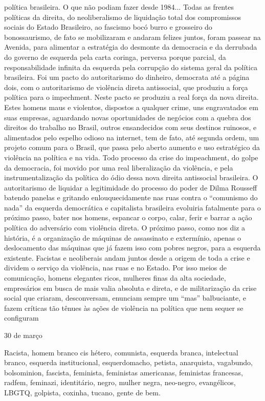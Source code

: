 política brasileira. O que não podiam fazer desde 1984... Todas as
frentes políticas da direita, do neoliberalismo de liquidação total dos
compromissos sociais do Estado Brasileiro, ao fascismo bocó burro e
grosseiro do bonossaurismo, de fato se mobilizaram e andaram felizes
juntos, foram passear na Avenida, para alimentar a estratégia do
desmonte da democracia e da derrubada do governo de esquerda pela carta
coringa, perversa porque parcial, da responsabilidade infinita da
esquerda pela corrupção do sistema geral da política brasileira. Foi um
pacto do autoritarismo do dinheiro, democrata até a página dois, com o
autoritarismo de violência direta antissocial, que produziu a força
política para o impechment. Neste pacto se produziu a real força da nova
direita. Estes homens maus e violentos, dispostos a qualquer crime, uns
engravatados em suas empresas, aguardando novas oportunidades de
negócios com a quebra dos direitos do trabalho no Brasil, outros
ensandecidos com seus destinos ruinosos, e alimentados pelo espelho
odioso na internet, tem de fato, até segunda ordem, um projeto comum
para o Brasil, que passa pelo aberto aumento e uso estratégico da
violência na política e na vida. Todo processo da crise do impeachment,
do golpe da democracia, foi movido por uma real liberalização da
violência, e pela instrumentalização da política do ódio dessa nova
direita antissocial brasileira. O autoritarismo de liquidar a
legitimidade do processo do poder de Dilma Rousseff batendo panelas e
gritando enlouquecidamente nas ruas contra o ``comunismo do nada'' da
esquerda democrática e capitalista brasileira evoluiria fatalmente para
o próximo passo, bater nos homens, espancar o corpo, calar, ferir e
barrar a ação política do adversário com violência direta. O próximo
passo, como nos diz a história, é a organização de máquinas de
assassinato e extermínio, apenas o deslocamento das máquinas que já
fazem isso com pobres negros, para a esquerda existente. Facistas e
neoliberais andam juntos desde a origem de toda a crise e dividem o
serviço da violência, nas ruas e no Estado. Por isso meios de
comunicação, homens elegantes ricos, mulheres finas da alta sociedade,
empresários em busca de mais valia absoluta e direta, e de militarização
da crise social que criaram, desconversam, enunciam sempre um ``mas''
balbuciante, e fazem críticas tão tênues às ações de violência na
política que nem sequer se configuram

30 de março

Racista, homem branco cis hétero, comunista, esquerda branca,
intelectual branco, esquerda institucional, esquerdomacho, petista,
anarquista, vagabundo, bolsominion, fascista, feminista, feministas
americanas, feministas francesas, radfem, feminazi, identitário, negro,
mulher negra, neo-negro, evangélicos, LBGTQ, golpista, coxinha, tucano,
gente de bem.

